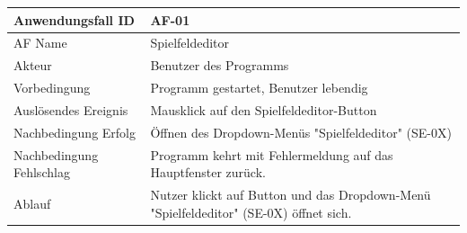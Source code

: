 \documentclass[11pt,a4paper]{article}
\begin{document}
\pagebreak

\par

\begin{tabular}[m]{|m{7cm}|m{9cm}|}
    \hline
    Anwendungsfall ID     & AF-01 \\
         \hline
    AF Name     &  Spielfeldeditor \\
         \hline
    Akteur&Benutzer des Programms \\
    \hline
    Vorbedingung&Programm gestartet, Benutzer lebendig\\
    \hline
    Auslösendes Ereignis&Mausklick auf den Spielfeldeditor-Button\\
    \hline
    Nachbedingung Erfolg&Öffnen des Dropdown-Menüs "Spielfeldeditor" (SE-0X)\\
    \hline
    Nachbedingung Fehlschlag&Programm kehrt mit Fehlermeldung auf das Hauptfenster zurück.\\
    \hline
    Ablauf&Nutzer klickt auf Button und das Dropdown-Menü "Spielfeldeditor" (SE-0X) öffnet sich.\\
    \hline
\end{tabular}
\par
\end{document}
